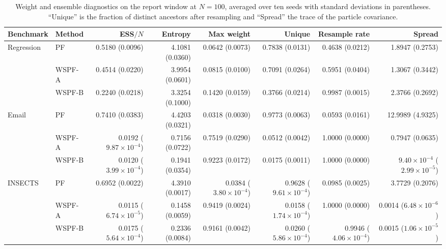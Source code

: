 \begin{table}[htbp]
\centering
\scriptsize
\setlength{\tabcolsep}{3pt}
\caption{Weight and ensemble diagnostics on the report window at $N=100$, averaged over ten seeds with standard deviations in parentheses. ``Unique'' is the fraction of distinct ancestors after resampling and ``Spread'' the trace of the particle covariance.}
\label{tab:s6_weight_diagnostics}
\begin{tabular}{@{}llrrrrrr@{}}
\toprule
Benchmark & Method & ESS$/N$ & Entropy & Max weight & Unique & Resample rate & Spread \\
\midrule
Regression & PF & 0.5180 (0.0096) & 4.1081 (0.0360) & 0.0642 (0.0073) & 0.7838 (0.0131) & 0.4638 (0.0212) & 1.8947 (0.2753) \\
 & WSPF-A & 0.4514 (0.0220) & 3.9954 (0.0601) & 0.0815 (0.0100) & 0.7091 (0.0264) & 0.5951 (0.0404) & 1.3067 (0.3442) \\
 & WSPF-B & 0.2240 (0.0218) & 3.3254 (0.1000) & 0.1420 (0.0159) & 0.3766 (0.0214) & 0.9987 (0.0015) & 2.3766 (0.2692) \\
\midrule
Email & PF & 0.7410 (0.0383) & 4.4203 (0.0321) & 0.0318 (0.0030) & 0.9773 (0.0063) & 0.0593 (0.0161) & 12.9989 (4.9325) \\
 & WSPF-A & 0.0192 ($9.87\times 10^{-4}$) & 0.7156 (0.0722) & 0.7519 (0.0290) & 0.0512 (0.0042) & 1.0000 (0.0000) & 0.7947 (0.0635) \\
 & WSPF-B & 0.0120 ($3.99\times 10^{-4}$) & 0.1941 (0.0354) & 0.9223 (0.0172) & 0.0175 (0.0011) & 1.0000 (0.0000) & $9.40\times 10^{-4}$ ($2.99\times 10^{-5}$) \\
\midrule
INSECTS & PF & 0.6952 (0.0022) & 4.3910 (0.0017) & 0.0384 ($3.80\times 10^{-4}$) & 0.9628 ($9.61\times 10^{-4}$) & 0.0985 (0.0025) & 3.7729 (0.2076) \\
 & WSPF-A & 0.0115 ($6.74\times 10^{-5}$) & 0.1458 (0.0059) & 0.9419 (0.0024) & 0.0158 ($1.74\times 10^{-4}$) & 1.0000 (0.0000) & 0.0014 ($6.48\times 10^{-6}$) \\
 & WSPF-B & 0.0175 ($5.64\times 10^{-4}$) & 0.2336 (0.0084) & 0.9161 (0.0042) & 0.0260 ($5.86\times 10^{-4}$) & 0.9946 ($4.06\times 10^{-4}$) & 0.0015 ($1.06\times 10^{-5}$) \\
\bottomrule
\end{tabular}
\end{table}
